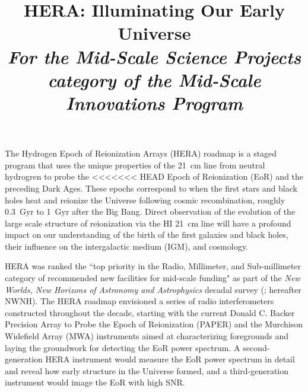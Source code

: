 \documentclass[preprint]{aastex}
\def\HI{{H{\small I }}}
\begin{document}
\title{HERA: Illuminating Our Early Universe\\
{\it For the Mid-Scale Science Projects category of the Mid-Scale Innovations Program}} 



{ \setlength{\parindent}{0cm}
The Hydrogen Epoch of Reionization Arrays (HERA) roadmap is a staged 
program that uses the unique properties of the 21~cm line from neutral 
hydrogren to probe the 
<<<<<<< HEAD
Epoch of Reionization (EoR) and the preceding Dark Ages.  These epochs
correspond to
when the first stars and black holes heat and reionize the
Universe following cosmic recombination, roughly
0.3~Gyr to 1~Gyr after the Big Bang. Direct observation of the evolution of the
large scale structure of reionization via the \HI 21~cm line will have a profound impact on our
understanding of the birth of the first galaxies and black holes, their
influence on the intergalactic medium (IGM), and cosmology.}  

HERA was ranked the ``top priority in the Radio, Millimeter, and Sub-millimeter
category of recommended new facilities for mid-scale funding" as part of the
{\it New Worlds, New Horizons of Astronomy and Astrophysics} decadal survey
(\citealt{astro2010}; hereafter NWNH).  
The HERA roadmap envisioned a series of
radio interferometers constructed throughout the decade, starting with the current
Donald C. Backer Precision Array to Probe the Epoch of Reionization (PAPER) and 
the Murchison Widefield Array (MWA) instruments 
aimed at characterizing
foregrounds and laying the groundwork for detecting the EoR power
spectrum. A second-generation HERA instrument would measure the EoR power spectrum in
detail and reveal how early structure in the Universe formed, and a
third-generation instrument would image the EoR with high SNR. 
\end{document}
